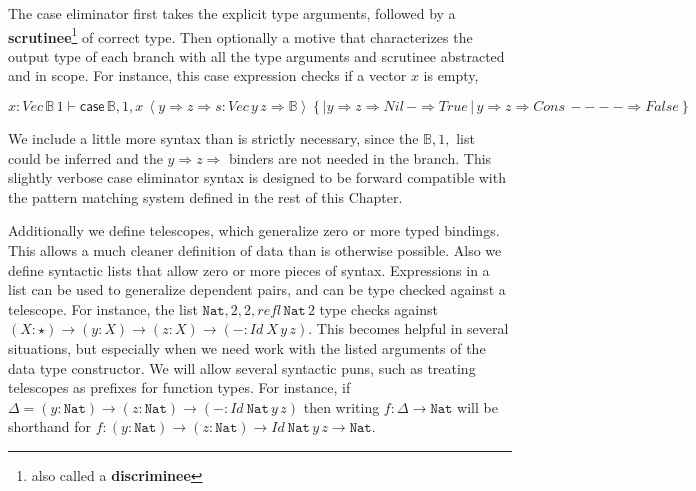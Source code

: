 


The case eliminator first takes the explicit type arguments, followed by a \textbf{scrutinee}\footnote{also called a \textbf{discriminee}} of correct type.
Then optionally a motive that characterizes the output type of each branch with all the type arguments and scrutinee abstracted and in scope.
For instance, this case expression checks if a vector $x$ is empty,

\[
x:Vec\,\mathbb{B}\,1\vdash\mathsf{case}\,\mathbb{B},1,x\,\left\langle y\Rightarrow z\Rightarrow s:Vec\,y\,z\Rightarrow\mathbb{B}\right\rangle \left\{ |y\Rightarrow z\Rightarrow Nil\,-\Rightarrow True\,|\,y\Rightarrow z\Rightarrow Cons\,----\Rightarrow False\right\} 
\]

We include a little more syntax than is strictly necessary, since the $\mathbb{B},1,$ list could be inferred and the $y\Rightarrow z\Rightarrow$ binders are not needed in the branch.
This slightly verbose case eliminator syntax is designed to be forward compatible with the pattern matching system defined in the rest of this Chapter. 

Additionally we define telescopes, which generalize zero or more typed bindings.
This allows a much cleaner definition of data than is otherwise possible.
Also we define syntactic lists that allow zero or more pieces of syntax.
Expressions in a list can be used to generalize dependent pairs, and can be type checked against a telescope.
For instance, the list $\mathtt{Nat},2,2,refl\,\mathtt{Nat}\,2$ type checks against $\left(X:\star\right)\rightarrow\left(y:X\right)\rightarrow\left(z:X\right)\rightarrow\left(-:Id\ X\,y\,z\right)$.
This becomes helpful in several situations, but especially when we need work with the listed arguments of the data type constructor.
We will allow several syntactic puns, such as treating telescopes as prefixes for function types. For instance, 
  if $\Delta=\left(y:\mathtt{Nat}\right)\rightarrow\left(z:\mathtt{Nat}\right)\rightarrow\left(-:Id\ \mathtt{Nat}\,y\,z\right)$
  then writing $f:\Delta\rightarrow\mathtt{Nat}$
  will be shorthand for $f:\left(y:\mathtt{Nat}\right)\rightarrow\left(z:\mathtt{Nat}\right)\rightarrow Id\ \mathtt{Nat}\,y\,z\rightarrow\mathtt{Nat}$.

